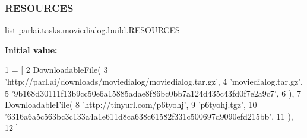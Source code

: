 \subsubsection{\texorpdfstring{R\+E\+S\+O\+U\+R\+C\+ES}{RESOURCES}}
{\footnotesize\ttfamily list parlai.\+tasks.\+moviedialog.\+build.\+R\+E\+S\+O\+U\+R\+C\+ES}

{\bfseries Initial value\+:}
\begin{DoxyCode}
1 =  [
2     DownloadableFile(
3         \textcolor{stringliteral}{'http://parl.ai/downloads/moviedialog/moviedialog.tar.gz'},
4         \textcolor{stringliteral}{'moviedialog.tar.gz'},
5         \textcolor{stringliteral}{'9b168d30111f13b9cc50e6a15885adae8f86bc0bb7a124d435c43fd0f7e2a9c7'},
6     ),
7     DownloadableFile(
8         \textcolor{stringliteral}{'http://tinyurl.com/p6tyohj'},
9         \textcolor{stringliteral}{'p6tyohj.tgz'},
10         \textcolor{stringliteral}{'6316a6a5c563bc3c133a4a1e611d8ca638c61582f331c500697d9090efd215bb'},
11     ),
12 ]
\end{DoxyCode}
